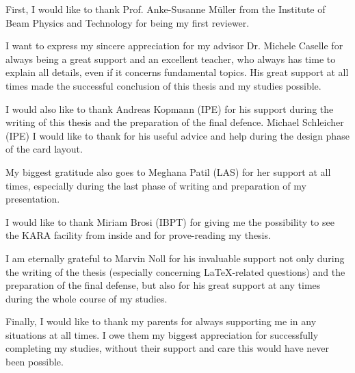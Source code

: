 First, I would like to thank Prof. Anke-Susanne Müller from the Institute of Beam Physics and Technology for being my first reviewer.

I want to express my sincere appreciation for my advisor Dr. Michele Caselle for always being a great support and an excellent teacher, who always has time to explain all details, even if it concerns fundamental topics. 
His great support at all times made the successful conclusion of this thesis and my studies possible.

I would also like to thank Andreas Kopmann (IPE) for his support during the writing of this thesis and the preparation of the final defence.
Michael Schleicher (IPE) I would like to thank for his useful advice and help during the design phase of the card layout.

My biggest gratitude also goes to Meghana Patil (LAS)  for her support at all times, especially during the last phase of writing and preparation of my presentation.

I would like to thank Miriam Brosi (IBPT) for giving me the possibility to see the KARA facility from inside and for prove-reading my thesis.

I am eternally grateful to Marvin Noll for his invaluable support not only during the writing of the thesis (especially concerning LaTeX-related questions) and the preparation of the final defense, but also for his great support at any times during the whole course of my studies.

Finally, I would like to thank my parents for always supporting me in any situations at all times. I owe them my biggest appreciation for successfully completing my studies, without their support and care this would have never been possible.

